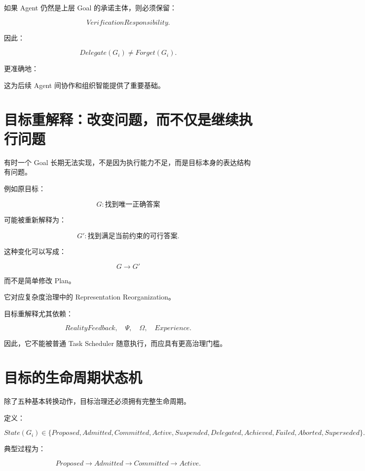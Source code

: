 如果 Agent 仍然是上层 Goal 的承诺主体，则必须保留：

\[
\boxed{
VerificationResponsibility.
}
\]

因此：

\[
Delegate(G_i)
\neq
Forget(G_i).
\]

更准确地：

\begin{statementbox}
\centering
{}
\end{statementbox}

这为后续 Agent 间协作和组织智能提供了重要基础。


\section{目标重解释：改变问题，而不仅是继续执行问题}

有时一个 Goal 长期无法实现，不是因为执行能力不足，而是目标本身的表达结构有问题。

例如原目标：

\[
G:
\text{找到唯一正确答案}
\]

可能被重新解释为：

\[
G':
\text{找到满足当前约束的可行答案}.
\]

这种变化可以写成：

\[
\boxed{
G
\rightarrow
G'
}
\]

而不是简单修改 Plan。

它对应复杂度治理中的 Representation Reorganization。

目标重解释尤其依赖：

\[
RealityFeedback,
\quad
\Psi,
\quad
\Omega,
\quad
Experience.
\]

因此，它不能被普通 Task Scheduler 随意执行，而应具有更高治理门槛。


\section{目标的生命周期状态机}

除了五种基本转换动作，目标治理还必须拥有完整生命周期。

定义：

\[
State(G_i)
\in
\{
Proposed,
Admitted,
Committed,
Active,
Suspended,
Delegated,
Achieved,
Failed,
Aborted,
Superseded
\}.
\]

典型过程为：

\[
Proposed
\rightarrow
Admitted
\rightarrow
Committed
\rightarrow
Active.
\]

